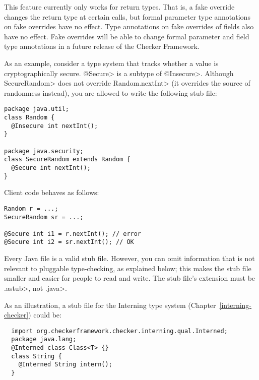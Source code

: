 This feature currently only works for return types.  That is, a fake
override changes the return type at certain calls, but formal parameter
type annotations on fake overrides have no effect.  Type annotations on
fake overrides of fields also have no effect.  Fake overrides will be able
to change formal parameter and field type annotations in a future release
of the Checker Framework.



As an example, consider a type system that tracks whether a value is
cryptographically secure.  \<@Secure> is a subtype of \<@Insecure>.
Although \<SecureRandom> does not override \<Random.nextInt> (it overrides
the source of randomness instead), you are allowed to write the following
stub file:

\begin{Verbatim}
package java.util;
class Random {
  @Insecure int nextInt();
}

package java.security;
class SecureRandom extends Random {
  @Secure int nextInt();
}
\end{Verbatim}

Client code behaves as follows:

\begin{Verbatim}
Random r = ...;
SecureRandom sr = ...;

@Secure int i1 = r.nextInt(); // error
@Secure int i2 = sr.nextInt(); // OK
\end{Verbatim}



Every Java file is a valid stub file.  However, you can omit information
that is not relevant to pluggable type-checking, as explained below;
this makes the stub file
smaller and easier for people to read and write.
The stub file's extension must be \<.astub>, not \<.java>.

As an illustration, a stub file for the Interning type system
(Chapter~\ref{interning-checker}) could be:

\begin{Verbatim}
  import org.checkerframework.checker.interning.qual.Interned;
  package java.lang;
  @Interned class Class<T> {}
  class String {
    @Interned String intern();
  }
\end{Verbatim}

